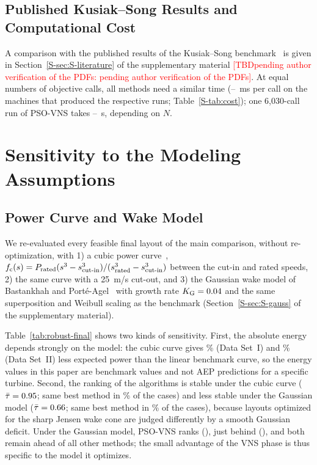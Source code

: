 \documentclass[journal,twoside]{IEEEtran}
\newcommand{\TBD}[1]{\textcolor{red}{[TBD\ifx\relax#1\relax\else: #1\fi]}}
\begin{document}
\subsection{Published Kusiak--Song Results and Computational Cost}
\label{sec:literature}
\label{sec:runtime}
A comparison with the published results of the Kusiak--Song benchmark~\cite{Kusiak2010,Eroglu2012,Eroglu2013,Bansal2017} is given in Section~\ref{S-sec:S-literature} of the supplementary material \TBD{pending author verification of the PDFs}. At equal numbers of objective calls, all methods need a similar time (\NMsPerCallMin--\NMsPerCallMax~ms per call on the machines that produced the respective runs; Table~\ref{S-tab:cost}); one 6,030-call run of PSO-VNS takes \NSecPerRunMin--\NSecPerRunMax~s, depending on $N$.

\section{Sensitivity to the Modeling Assumptions}
\label{sec:robustness}
\subsection{Power Curve and Wake Model}
\label{sec:powercurve}
\label{sec:gaussian}


We re-evaluated every feasible final layout of the main comparison, without re-optimization, with 1) a cubic power curve~\cite{Carrillo2013}, $f_{\rm c}(s)=P_{\text{rated}}(s^3-s_{\text{cut-in}}^3)/(s_{\text{rated}}^3-s_{\text{cut-in}}^3)$ between the cut-in and rated speeds, 2) the same curve with a 25~m/s cut-out, and 3) the Gaussian wake model of Bastankhah and Port\'e-Agel~\cite{Bastankhah2014} with growth rate $K_{\rm G}=0.04$ and the same superposition and Weibull scaling as the benchmark (Section~\ref{S-sec:S-gauss} of the supplementary material).

Table~\ref{tab:robust-final} shows two kinds of sensitivity. First, the absolute energy depends strongly on the model: the cubic curve gives \NCubicOverI\% (Data Set~I) and \NCubicOverII\% (Data Set~II) less expected power than the linear benchmark curve, so the energy values in this paper are benchmark values and not AEP predictions for a specific turbine. Second, the ranking of the algorithms is stable under the cubic curve ($\bar\tau=0.95$; same best method in \NSameCubic\% of the cases) and less stable under the Gaussian model ($\bar\tau=0.66$; same best method in \NSameGauss\% of the cases), because layouts optimized for the sharp Jensen wake cone are judged differently by a smooth Gaussian deficit. Under the Gaussian model, PSO-VNS ranks \NPosGaussPSOVNS{} (\NRankGaussPSOVNS), just behind \NBestGauss{} (\NRankGaussPSO), and both remain ahead of all other methods; the small advantage of the VNS phase is thus specific to the model it optimizes.
\end{document}
